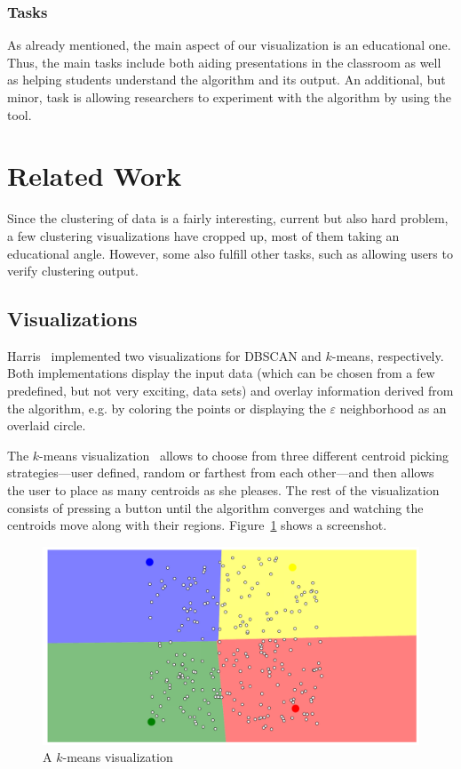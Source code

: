 \documentclass{vgtc} %
\begin{document}
\subsubsection{Tasks}

As already mentioned, the main aspect of our visualization is an educational one.
Thus, the main tasks include both aiding presentations in the classroom as well as
helping students understand the algorithm and its output. An additional, but minor,
task is allowing researchers to experiment with the algorithm by using the tool.

\section{Related Work} %

Since the clustering of data is a fairly interesting, current but also hard
problem, a few clustering visualizations have cropped up, most of them taking
an educational angle. However, some also fulfill other tasks, such as allowing
users to verify clustering output.

\subsection{Visualizations}

Harris~\cite{dbscan,kmeans} implemented two visualizations for DBSCAN and
$k$-means, respectively. Both implementations display the input data (which can
be chosen from a few predefined, but not very exciting, data sets) and overlay
information derived from the algorithm, e.g. by coloring the points or
displaying the $\varepsilon$ neighborhood as an overlaid circle.

The $k$-means visualization~\cite{kmeans} allows to choose from three different
centroid picking strategies---user defined, random or farthest from each
other---and then allows the user to place as many centroids as she pleases. The
rest of the visualization consists of pressing a button until the algorithm
converges and watching the centroids move along with their regions.
Figure~\ref{fig:kmeans} shows a screenshot.

\begin{figure}[tb]
    \centering
    \includegraphics[width=\columnwidth]{kmeans}
    \caption{A $k$-means visualization}
    \label{fig:kmeans}
\end{figure}
\end{document}
